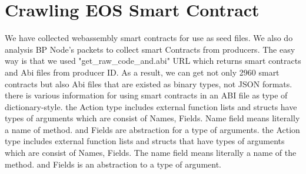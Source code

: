\section{Crawling EOS Smart Contract}
We have collected webassembly smart contracts for use as seed files.
We also do analysis BP Node's packets to collect smart Contracts from producers. The easy way is that we used  "get\_raw\_code\_and.abi" URL which returns smart contracts and Abi files from producer ID. As a result, we can get not only 2960 smart contracts but also Abi files that are existed as binary types, not JSON formats.
there is various information for using smart contracts in an ABI file as type of dictionary-style. 
the Action type includes external function lists and structs have types of arguments which are consist of Names, Fields. Name field means literally a name of method. and Fields are abstraction for a type of arguments.
the Action type includes external function lists and structs that have types of arguments which are consist of Names, Fields. The name field means literally a name of the method. and Fields is an abstraction to a type of argument.
